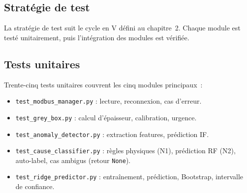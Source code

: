\subsection{Stratégie de test}

La stratégie de test suit le cycle en V défini au chapitre~2. Chaque module est testé unitairement, puis l'intégration des modules est vérifiée.

\subsection{Tests unitaires}

Trente-cinq tests unitaires couvrent les cinq modules principaux~:

\begin{itemize}
  \item \texttt{test\_modbus\_manager.py} : lecture, reconnexion, cas d'erreur.
  \item \texttt{test\_grey\_box.py} : calcul d'épaisseur, calibration, urgence.
  \item \texttt{test\_anomaly\_detector.py} : extraction features, prédiction IF.
  \item \texttt{test\_cause\_classifier.py} : règles physiques (N1), prédiction RF (N2), auto-label, cas ambigus (retour \texttt{None}).
  \item \texttt{test\_ridge\_predictor.py} : entraînement, prédiction, Bootstrap, intervalle de confiance.
\end{itemize}

